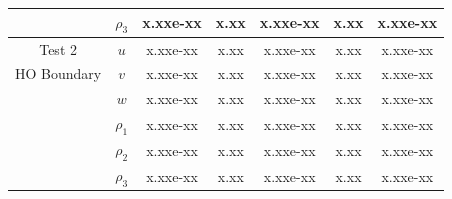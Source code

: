 \documentclass[final]{siamltex}
\begin{document}
\begin{table}[h]
\begin{center}
\begin{tabular}{ccccccc}
                    & $\rho_3$ & x.xxe-xx & x.xx & x.xxe-xx & x.xx & x.xxe-xx \\
\hline
Test 2              & $u$      & x.xxe-xx & x.xx & x.xxe-xx & x.xx & x.xxe-xx \\
HO Boundary         & $v$      & x.xxe-xx & x.xx & x.xxe-xx & x.xx & x.xxe-xx \\
                    & $w$      & x.xxe-xx & x.xx & x.xxe-xx & x.xx & x.xxe-xx \\
                    & $\rho_1$ & x.xxe-xx & x.xx & x.xxe-xx & x.xx & x.xxe-xx \\
                    & $\rho_2$ & x.xxe-xx & x.xx & x.xxe-xx & x.xx & x.xxe-xx \\
                    & $\rho_3$ & x.xxe-xx & x.xx & x.xxe-xx & x.xx & x.xxe-xx
\end{tabular}
\end{center}
\end{table}
\end{document}
